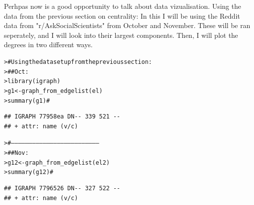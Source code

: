 \documentclass[12pt]{article}\usepackage[]{graphicx}\usepackage[]{color}
\makeatletter
\newcommand{\hlcom}[1]{\textcolor[rgb]{0.404,0.408,0.42}{#1}}%
\newcommand{\hlstd}[1]{\textcolor[rgb]{0.882,0.878,0.898}{#1}}%
\newcommand{\hlkwb}[1]{\textcolor[rgb]{0.902,0.675,0.196}{#1}}%
\newcommand{\hlkwd}[1]{\textcolor[rgb]{0.733,0.388,0.812}{#1}}%
\newenvironment{kframe}{%
 \def\at@end@of@kframe{}%
 \ifinner\ifhmode%
  \def\at@end@of@kframe{\end{minipage}}%
  \begin{minipage}{\columnwidth}%
 \fi\fi%
 \def\FrameCommand##1{\hskip\@totalleftmargin \hskip-\fboxsep
 \colorbox{shadecolor}{##1}\hskip-\fboxsep
     \hskip-\linewidth \hskip-\@totalleftmargin \hskip\columnwidth}%
 \MakeFramed {\advance\hsize-\width
   \@totalleftmargin\z@ \linewidth\hsize
   \@setminipage}}%
 {\par\unskip\endMakeFramed%
 \at@end@of@kframe}
\newenvironment{knitrout}{}{} %
\makeatother
\begin{document}
\begin{flushleft}
Perhpas now is a good opportunity to talk about data vizualisation. Using the data from the previous section on centrality:
In this I will be using the Reddit data from "r/AskSocialScientists" from October and November. These will be ran seperately, and I will look into their largest components. Then, I will plot the degrees in two different ways.

\begin{knitrout}
\color{fgcolor}\begin{kframe}
\begin{alltt}
\hlstd{> }\hlcom{# Using the data set up from the previous section:}
\hlstd{> }\hlcom{##    Oct:}
\hlstd{> }\hlkwd{library}\hlstd{(igraph)}
\hlstd{> }\hlstd{g1} \hlkwb{<-} \hlkwd{graph_from_edgelist}\hlstd{(el)}
\hlstd{> }\hlkwd{summary}\hlstd{(g1)} \hlcom{#}
\end{alltt}
\begin{verbatim}
## IGRAPH 77958ea DN-- 339 521 -- 
## + attr: name (v/c)
\end{verbatim}
\begin{alltt}
\hlstd{> }\hlcom{#---------------------------------------------------------------------------}
\hlstd{> }\hlcom{##   Nov:}
\hlstd{> }\hlstd{g12} \hlkwb{<-} \hlkwd{graph_from_edgelist}\hlstd{(el2)}
\hlstd{> }\hlkwd{summary}\hlstd{(g12)} \hlcom{#}
\end{alltt}
\begin{verbatim}
## IGRAPH 7796526 DN-- 327 522 -- 
## + attr: name (v/c)
\end{verbatim}
\end{kframe}
\end{knitrout}


\end{flushleft}
\end{document}
